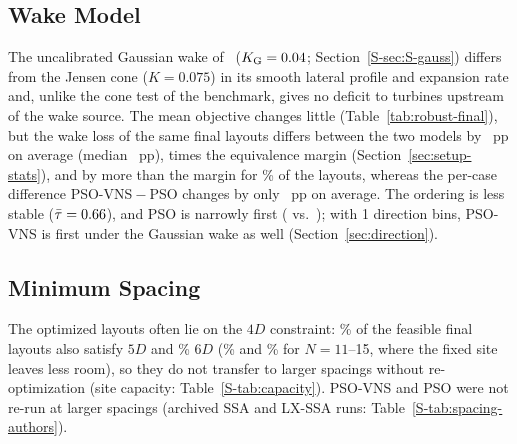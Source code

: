 \subsection{Wake Model}
\label{sec:gaussian}
The uncalibrated Gaussian wake of~\cite{Bastankhah2014} ($K_{\rm G}=0.04$; Section~\ref{S-sec:S-gauss}) differs from the Jensen cone ($K=0.075$) in its smooth lateral profile and expansion rate and, unlike the cone test of the benchmark, gives no deficit to turbines upstream of the wake source. The mean objective changes little (Table~\ref{tab:robust-final}), but the wake loss of the same final layouts differs between the two models by \NXModelShiftMean~pp on average (median \NXModelShiftMedian~pp), \NXModelShiftRatio{} times the equivalence margin (Section~\ref{sec:setup-stats}), and by more than the margin for \NXModelShiftAboveMarginPct\% of the \NXModelShiftNLayouts{} layouts, whereas the per-case difference PSO-VNS${}-{}$PSO changes by only \NXModelShiftPairMean~pp on average. The ordering is less stable ($\bar\tau=0.66$), and PSO is narrowly first (\NFGaussFifteenRankPSO{} vs.\ \NFGaussFifteenRankPSOVNS); with 1\textdegree{} direction bins, PSO-VNS is first under the Gaussian wake as well (Section~\ref{sec:direction}).

\subsection{Minimum Spacing}
\label{sec:spacing}
The optimized layouts often lie on the $4D$ constraint: \NSpFiveAll\% of the feasible final layouts also satisfy $5D$ and \NSpSixAll\% $6D$ (\NSpFiveLarge\% and \NSpSixLarge\% for $N=11$--15, where the fixed site leaves less room), so they do not transfer to larger spacings without re-optimization (site capacity: Table~\ref{S-tab:capacity}). PSO-VNS and PSO were not re-run at larger spacings (archived SSA and LX-SSA runs: Table~\ref{S-tab:spacing-authors}).

